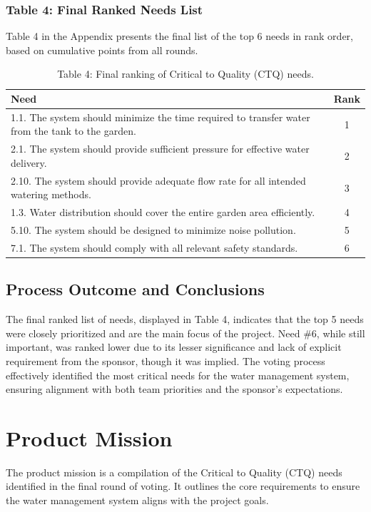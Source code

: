 \documentclass[11pt]{article}
\begin{document}
\subsubsection{Table 4: Final Ranked Needs List}
Table 4 in the Appendix presents the final list of the top 6 needs in rank order, based on cumulative points from all rounds.

\begin{table}[H]
\centering
\caption*{Table 4: Final ranking of Critical to Quality (CTQ) needs.}
\begin{tabular}{|p{12cm}|c|}
\hline
\textbf{Need} & \textbf{Rank} \\
\hline
1.1. The system should minimize the time required to transfer water from the tank to the garden. & 1 \\
2.1. The system should provide sufficient pressure for effective water delivery. & 2 \\
2.10. The system should provide adequate flow rate for all intended watering methods. & 3 \\
1.3. Water distribution should cover the entire garden area efficiently. & 4 \\
5.10. The system should be designed to minimize noise pollution. & 5 \\
7.1. The system should comply with all relevant safety standards. & 6 \\
\hline
\end{tabular}
\end{table}

\subsection{Process Outcome and Conclusions}

The final ranked list of needs, displayed in Table 4, indicates that the top 5 needs were closely prioritized and are the main focus of the project. Need \#6, while still important, was ranked lower due to its lesser significance and lack of explicit requirement from the sponsor, though it was implied. The voting process effectively identified the most critical needs for the water management system, ensuring alignment with both team priorities and the sponsor's expectations.

\section{Product Mission}
The product mission is a compilation of the Critical to Quality (CTQ) needs identified in the final round of voting. It outlines the core requirements to ensure the water management system aligns with the project goals.
\end{document}
